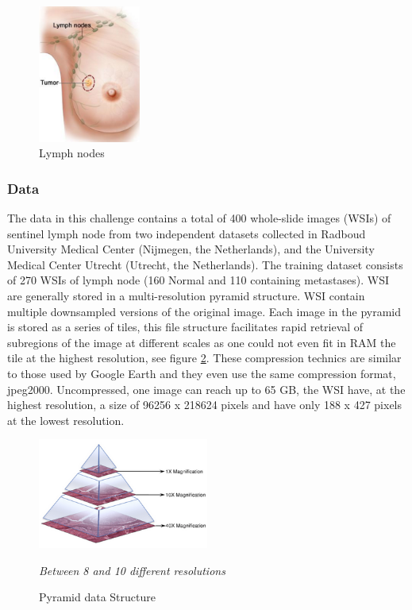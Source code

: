 \documentclass[a4paper,10pt]{article}
\begin{document}
\begin{figure}[!ht]
\centering
\includegraphics[width=0.3\textwidth]{Booby.png}
\caption{Lymph nodes}
\label{LymphNode}
\end{figure}

\subsubsection{Data}
The data in this challenge contains a total of 400 whole-slide images (WSIs) of sentinel lymph node from two independent datasets collected in Radboud University Medical Center (Nijmegen, the Netherlands), and the University Medical Center Utrecht (Utrecht, the Netherlands). The training dataset consists of 270 WSIs of lymph node (160 Normal and 110 containing metastases). WSI are generally stored in a multi-resolution pyramid structure. WSI contain multiple downsampled versions of the original image. Each image in the pyramid is stored as a series of tiles, this file structure facilitates rapid retrieval of subregions of the image at different scales as one could not even fit in RAM the tile at the highest resolution, see figure \ref{fig: Pyramid}. These compression technics are similar to those used by Google Earth and they even use the same compression format, jpeg2000. Uncompressed, one image can reach up to 65 GB, the WSI have, at the highest resolution, a size of 96256 x 218624 pixels and have only 188 x 427 pixels at the lowest resolution.


\begin{figure}[!ht]
\centering
\includegraphics[width=0.5\textwidth]{pyramid.png}
\caption{Pyramid data Structure}
\textit{Between 8 and 10 different resolutions}
\label{fig: Pyramid}
\end{figure}
\end{document}
